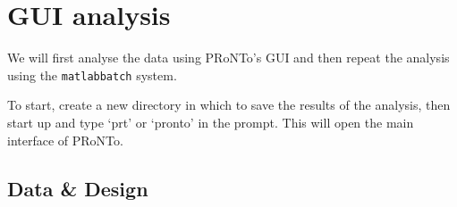 \section{GUI analysis}

We will first analyse the data using PRoNTo's GUI and then repeat the analysis using the {\tt matlabbatch} system.

To start, create a new directory in which to save the results of the analysis, then start up \matlab{} and type `prt' or `pronto' in the \matlab{} prompt. This will open the main interface of PRoNTo.


\subsection{Data \& Design}


